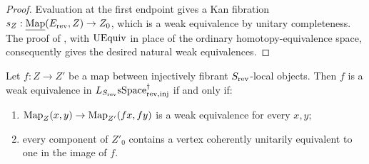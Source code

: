 \documentclass[a4paper,dvipdfmx,11pt]{amsart}
\begin{document}
\begin{proof}
  Evaluation at the first endpoint gives a Kan fibration $s_Z: \underline{\operatorname{Map}}(E_{\mathrm{rev}},Z) \to Z_0$, which is a weak equivalence by unitary completeness.
  The proof of \cite[Proposition~6.4]{Rez01}, with $\mathrm{UEquiv}$ in place of the ordinary homotopy-equivalence space, consequently gives the desired natural weak equivalences.
\end{proof}

\begin{proposition}\label{jt.lem.rezk-criterion}
  Let $f:Z\to Z'$ be a map between injectively fibrant $S_{\mathrm{rev}}$-local objects.
  Then $f$ is a weak equivalence in $L_{S_{\mathrm{rev}}}\mathrm{sSpace}^{\dag}_{\mathrm{rev},\mathrm{inj}}$ if and only if:
  \begin{enumerate}
    \item $\operatorname{Map}_Z(x,y)\to\operatorname{Map}_{Z'}(fx,fy)$ is a weak equivalence for every $x,y$;
    \item every component of $Z'_0$ contains a vertex coherently unitarily equivalent to one in the image of $f$.
  \end{enumerate}
\end{proposition}
\end{document}
